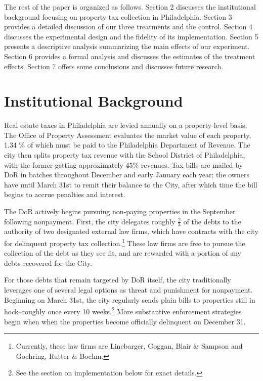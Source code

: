 \documentclass[12pt,titlepage]{article}
\begin{document}
The rest of the paper is organized as follows. Section 2 discusses the
institutional background focusing on property tax collection in
Philadelphia.  Section 3 provides a detailed discussion of our three
treatments and the control. Section 4 discusses the experimental
design and the fidelity of its implementation. Section 5
presents a descriptive analysis summarizing the main effects of our experiment. 
Section 6 provides a formal analysis and discusses the estimates of the treatment
effects.  Section 7 offers some conclusions and discusses future research. 



\section{Institutional Background}

Real estate taxes in Philadelphia are levied annually on a
property-level basis.  The Office of Property Assessment evaluates the
market value of each property, 1.34 \% of which must be paid to the
Philadelphia Department of Revenue. The city then splits property tax
revenue with the School District of Philadelphia, with the former
getting approximately 45\% revenues.  Tax bills are mailed by DoR in
batches throughout December and early January each year; the owners
have until March 31st to remit their balance to the City, after which
time the bill begins to accrue penalties and interest.

The DoR actively begins pursuing non-paying properties in the
September following nonpayment.  First, the city delegates roughly
$\frac{2}{3}$ of the debts to the authority of two designated external
law firms, which have contracts with the city for delinquent property
tax collection.\footnote{Currently, these law firms are Linebarger,
  Goggan, Blair \& Sampson and Goehring, Rutter \& Boehm.} These law
firms are free to pursue the collection of the debt as they see fit,
and are rewarded with a portion of any debts recovered for the City.

For those debts that remain targeted by DoR itself, the city
traditionally leverages one of several legal options as threat and
punishment for nonpayment. Beginning on March 31st, the city regularly
sends plain bills to properties still in hock--roughly once every 10
weeks.\footnote{See the section on implementation below for exact
  details.} More substantive enforcement strategies begin when when
the properties become officially delinquent on December 31.
\end{document}
